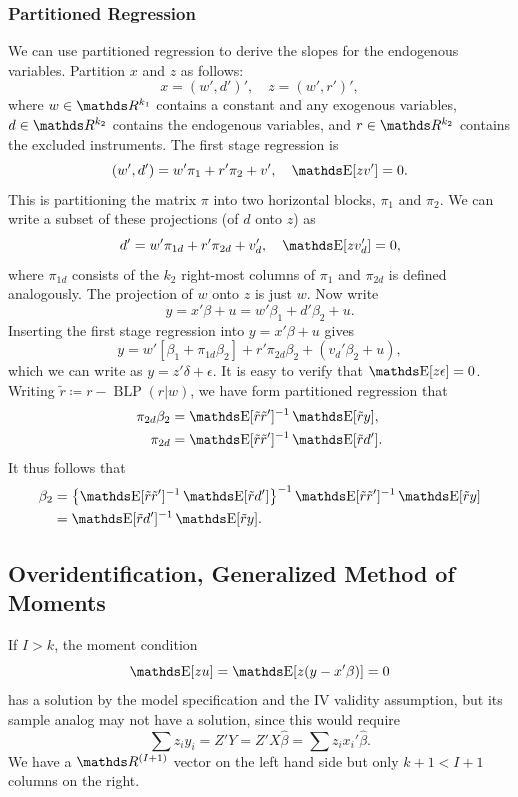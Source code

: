 \documentclass[letterpaper, 10pt]{article}
\DeclareMathOperator{\BLP}{BLP}
\begin{document}
\subsubsection{Partitioned Regression}
We can use partitioned regression to derive the slopes for the endogenous variables.
Partition \(x\) and \(z\) as follows:
\[
  x = (w', d')', \quad
  z = (w', r')',
\]
where \(w \in \RR^{k_1}\) contains a constant and any exogenous variables, \(d \in \RR^{k_2}\) contains the endogenous variables, and \(r \in \RR^{k_2}\) contains the excluded instruments.
The first stage regression is
\[
  (w', d') = w' \pi_1 + r' \pi_2 + v',\quad \E[zv'] = 0.
\]
This is partitioning the matrix \(\pi\) into two horizontal blocks, \(\pi_1\) and \(\pi_2\).
We can write a subset of these projections (of \(d\) onto \(z\)) as
\[
  d' = w' \pi_{1d} + r' \pi_{2d} + v_d',\quad \E[zv_d'] = 0,
\]
where \(\pi_{1d}\) consists of the \(k_2\) right-most columns of \(\pi_1\) and \(\pi_{2d}\) is defined analogously.
The projection of \(w\) onto \(z\) is just \(w\).
Now write
\[
  y = x' \beta + u
  = w' \beta_1 + d' \beta_2 + u.
\]
Inserting the first stage regression into \(y = x' \beta + u\) gives
\[
  y = w' [\beta_1 + \pi_{1d} \beta_2] + r' \pi_{2d} \beta_2 + (v_d' \beta_2 + u),
\]
which we can write as \(y = z' \delta + \epsilon\).
It is easy to verify that \(\E[z \epsilon] = 0\).
Writing \(\tilde{r} \coloneqq r - \BLP(r|w)\), we have form partitioned regression that
\begin{align*}
  \pi_{2d} \beta_2
  &= \E[\tilde{r} \tilde{r}']^{-1} \E[\tilde{r} y], \\
  \pi_{2d}
  &= \E[\tilde{r} \tilde{r}']^{-1} \E[\tilde{r} d'].
\end{align*}
It thus follows that
\begin{align*}
  \beta_2
  &= \left\{ \E[\tilde{r} \tilde{r}']^{-1} \E[\tilde{r} d'] \right\}^{-1}
    \E[\tilde{r} \tilde{r}']^{-1} \E[\tilde{r} y] \\
  &= \E[\tilde{r} d']^{-1} \E[\tilde{r} y].
\end{align*}



\subsection{Overidentification, Generalized Method of Moments}
If \(I > k\), the moment condition
\[
  \E[zu]
  = \E[z(y - x'\beta)] = 0
\]
has a solution by the model specification and the IV validity assumption, but its sample analog may not have a solution, since this would require
\[
  \sum z_i y_i
  = Z'Y = Z' X \hat{\beta}
  = \sum z_i x_i' \hat{\beta}.
\]
We have a \(\RR^{(I + 1)}\) vector on the left hand side but only \(k + 1 < I + 1\) columns on the right.
\end{document}
